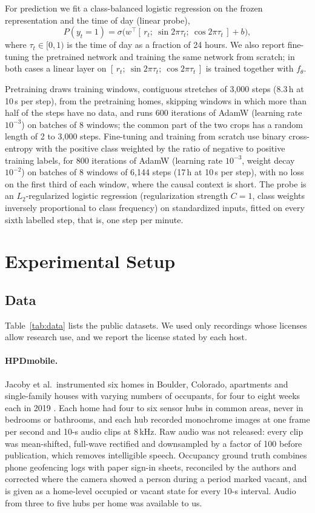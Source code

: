 \documentclass[11pt]{article}
\begin{document}
For prediction we fit a class-balanced logistic regression on the frozen representation and the time of day (linear probe),
\begin{equation}
P(y_t = 1) = \sigma\big(w^\top [\, r_t;\ \sin 2\pi\tau_t;\ \cos 2\pi\tau_t \,] + b\big),
\label{eq:probe}
\end{equation}
where $\tau_t \in [0,1)$ is the time of day as a fraction of 24 hours. We also report fine-tuning the pretrained network and training the same network from scratch; in both cases a linear layer on $[\,r_t;\ \sin 2\pi\tau_t;\ \cos 2\pi\tau_t\,]$ is trained together with $f_\theta$.

Pretraining draws training windows, contiguous stretches of 3,000 steps (8.3\,h at 10\,s per step), from the pretraining homes, skipping windows in which more than half of the steps have no data, and runs 600 iterations of AdamW (learning rate $10^{-3}$) on batches of 8 windows; the common part of the two crops has a random length of 2 to 3,000 steps. Fine-tuning and training from scratch use binary cross-entropy with the positive class weighted by the ratio of negative to positive training labels, for 800 iterations of AdamW (learning rate $10^{-3}$, weight decay $10^{-2}$) on batches of 8 windows of 6,144 steps (17\,h at 10\,s per step), with no loss on the first third of each window, where the causal context is short. The probe is an $L_2$-regularized logistic regression (regularization strength $C=1$, class weights inversely proportional to class frequency) on standardized inputs, fitted on every sixth labelled step, that is, one step per minute.

\section{Experimental Setup}
\label{sec:setup}

\subsection{Data}
Table~\ref{tab:data} lists the public datasets. We used only recordings whose licenses allow research use, and we report the license stated by each host.

\paragraph{HPDmobile.} Jacoby et al.\ instrumented six homes in Boulder, Colorado, apartments and single-family houses with varying numbers of occupants, for four to eight weeks each in 2019 \citep{jacoby2021hpdmobile}. Each home had four to six sensor hubs in common areas, never in bedrooms or bathrooms, and each hub recorded monochrome images at one frame per second and 10-s audio clips at 8\,kHz. Raw audio was not released: every clip was mean-shifted, full-wave rectified and downsampled by a factor of 100 before publication, which removes intelligible speech. Occupancy ground truth combines phone geofencing logs with paper sign-in sheets, reconciled by the authors and corrected where the camera showed a person during a period marked vacant, and is given as a home-level occupied or vacant state for every 10-s interval. Audio from three to five hubs per home was available to us.
\end{document}
